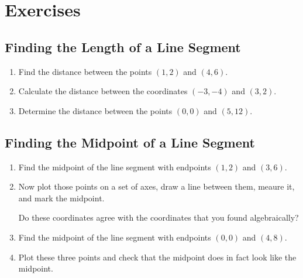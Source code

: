 \documentclass[12pt]{article}
\begin{document}
\begin{center}
\end{center}

\newpage

\section*{Exercises}

\subsection*{Finding the Length of a Line Segment}
\begin{enumerate}
    \item Find the distance between the points \((1, 2)\) and \((4, 6)\).
    \item Calculate the distance between the coordinates \((-3, -4)\) and \((3, 2)\).
    \item Determine the distance between the points \((0, 0)\) and \((5, 12)\).
\end{enumerate}

\subsection*{Finding the Midpoint of a Line Segment}
\begin{enumerate}
    \item Find the midpoint of the line segment with endpoints \((1, 2)\) and \((3, 6)\).
    \item Now plot those points on a set of axes, draw a line between them, meaure it, and mark the midpoint.
    
    Do these coordinates agree with the coordinates that you found algebraically?
    \item Find the midpoint of the line segment with endpoints \((0, 0)\) and \((4, 8)\).
    \item Plot these three points and check that the midpoint does in fact look like the midpoint.
\end{enumerate}
\end{document}
